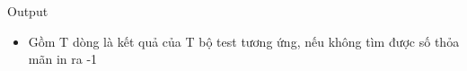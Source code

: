 Output
\begin{itemize}
	\item     Gồm T dòng là kết quả của T bộ test tương ứng, nếu không tìm được số thỏa mãn in ra -1   
\end{itemize}